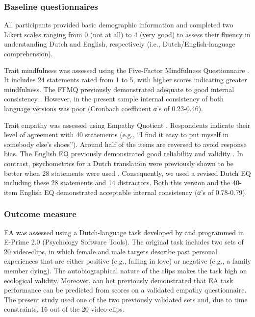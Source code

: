 \documentclass[authordate, empirical]{jote-new-article}
\begin{document}
	\subsubsection{Baseline questionnaires}



	All participants provided basic demographic information and completed two Likert scales ranging from 0 (not at all) to 4 (very good) to assess their fluency in understanding Dutch and English, respectively (i.e., Dutch/English-language comprehension).



	Trait mindfulness was assessed using the Five-Factor Mindfulness Questionnaire \parencites[FFMQ;][]{Bohlmeijer2011}. It includes 24 statements rated from 1 to 5, with higher scores indicating greater mindfulness. The FFMQ previously demonstrated adequate to good internal consistency \parencites{Bohlmeijer2011}. However, in the present sample internal consistency of both language versions was poor (Cronbach coefficient \emph{α}'s of 0.23-0.46).



	Trait empathy was assessed using Empathy Quotient \parencites[EQ;][]{Groen2015}{Lawrence2004}. Respondents indicate their level of agreement with 40 statements (e.g., “I find it easy to put myself in somebody else's shoes”). Around half of the items are reversed to avoid response bias. The English EQ previously demonstrated good reliability and validity \parencites{Lawrence2004}. In contrast, psychometrics for a Dutch translation were previously shown to be better when 28 statements were used \parencites{Groen2015}. Consequently, we used a revised Dutch EQ including these 28 statements and 14 distractors. Both this version and the 40-item English EQ demonstrated acceptable internal consistency (\emph{α}'s of 0.78-0.79).



	\subsubsection{Outcome measure}



	EA was assessed using a Dutch-language task developed by \textcites{aanhetRot2014} and programmed in E-Prime 2.0 (Psychology Software Tools). The original task includes two sets of 20 video-clips, in which female and male targets describe past personal experiences that are either positive (e.g., falling in love) or negative (e.g., a family member dying). The autobiographical nature of the clips makes the task high on ecological validity. Moreover, aan het \textcites{aanhetRot2014} previously demonstrated that EA task performance can be predicted from scores on a validated empathy questionnaire. The present study used one of the two previously validated sets and, due to time constraints, 16 out of the 20 video-clips.
\end{document}
